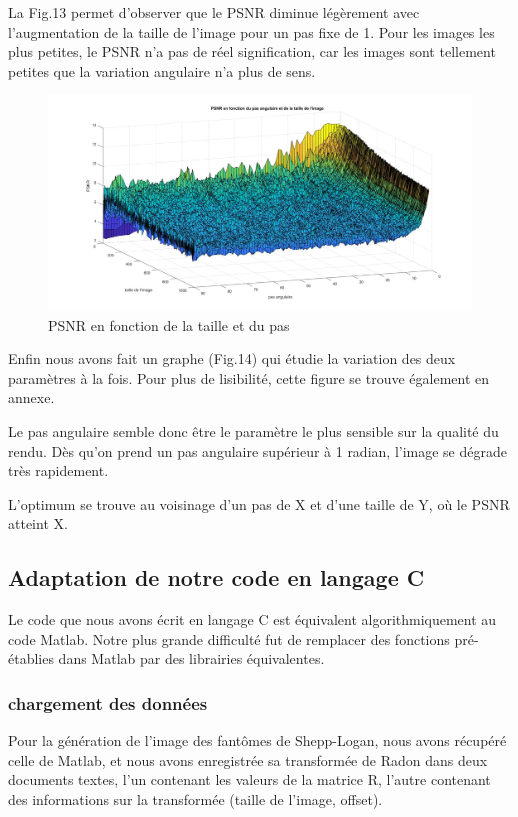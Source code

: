 \documentclass[conference]{IEEEtran}
\begin{document}
La Fig.13 permet d'observer que le PSNR diminue légèrement avec l'augmentation de la taille de l'image pour un pas fixe de 1. Pour les images les plus petites, le PSNR n'a pas de réel signification, car les images sont tellement petites que la variation angulaire n'a plus de sens.

\begin{figure}[H]
\centering
\includegraphics[scale=0.13]{PSNR1}
	\caption[PSNR en fonction de la taille et du pas]{PSNR en fonction de la taille et du pas}
\label{fig:gallery}
\end{figure}

Enfin nous avons fait un graphe (Fig.14) qui étudie la variation des deux paramètres à la fois. Pour plus de lisibilité, cette figure se trouve également en annexe.
 
Le pas angulaire semble donc être le paramètre le plus sensible sur la qualité du rendu. Dès qu'on prend un pas angulaire supérieur à 1 radian, l'image se dégrade très rapidement.

L'optimum se trouve au voisinage d'un pas de X et d'une taille de Y, où le PSNR atteint X.

\subsection{Adaptation de notre code en langage C}

Le code que nous avons écrit en langage C est équivalent algorithmiquement au code Matlab. Notre plus grande difficulté fut de remplacer des fonctions pré-établies dans Matlab par des librairies équivalentes.

\subsubsection{chargement des données }

Pour la génération de l'image des fantômes de Shepp-Logan, nous avons récupéré celle de Matlab, et nous avons enregistrée sa transformée de Radon dans deux documents textes, l'un contenant les valeurs de la matrice R, l'autre contenant des informations sur la transformée (taille de l'image, offset).
\end{document}
